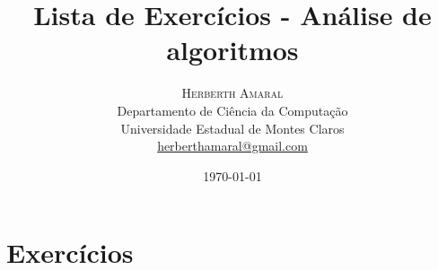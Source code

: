 \documentclass[11pt]{article}
\title{\vspace{.5cm}\fontsize{24pt}{10pt}\selectfont\textbf{\sc Lista de Exercícios - Análise de algoritmos}} %
\author{
\large
\textsc{Herberth Amaral}\\[2mm] %
\normalsize Departamento de Ciência da Computação \\
\normalsize Universidade Estadual de Montes Claros \\
\normalsize \href{mailto:herberthamaral@gmail.com}{herberthamaral@gmail.com} %
\vspace{-5mm}
}
\date{\today}
\begin{document}
\maketitle %

\thispagestyle{fancy} %

%
% 

\newpage

\section*{Exercícios}
\end{document}
